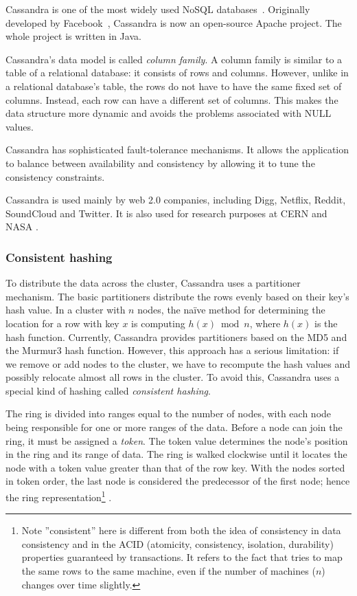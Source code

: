 Cassandra is one of the most widely used NoSQL databases~\cite{Cassandra}. Originally developed by Facebook~\cite{Lakshman:2010:CDS:1773912.1773922}, Cassandra is now an open-source Apache project. The whole project is written in Java.

Cassandra's data model is called \emph{column family}. A column family is similar to a table of a relational database: it consists of rows and columns. However, unlike in a relational database's table, the rows do not have to have the same fixed set of columns. Instead, each row can have a different set of columns. This makes the data structure more dynamic and avoids the problems associated with NULL values.


Cassandra has sophisticated fault-tolerance mechanisms. It allows the application to balance between availability and consistency by allowing it to tune the consistency constraints.

Cassandra is used mainly by web 2.0 companies, including Digg, Netflix, Reddit, SoundCloud and Twitter. It is also used for research purposes at CERN and NASA \cite{CassandraCompanies}.

\subsubsection{Consistent hashing}

To distribute the data across the cluster, Cassandra uses a partitioner mechanism. The basic partitioners distribute the rows evenly based on their key's hash value. In a cluster with $n$ nodes, the na\"ive method for determining the location for a row with key $x$ is computing $ h(x) \bmod n $, where $h(x)$ is the hash function. Currently, Cassandra provides partitioners based on the MD5 and the Murmur3 hash function. However, this approach has a serious limitation: if we remove or add nodes to the cluster, we have to recompute the hash values and possibly relocate almost all rows in the cluster. To avoid this, Cassandra uses a special kind of hashing called \textit{consistent hashing}.

The ring is divided into ranges equal to the number of nodes, with each node being responsible for one or more ranges of the data. Before a node can join the ring, it must be assigned a \textit{token}. The token value determines the node's position in the ring and its range of data. The ring is walked clockwise until it locates the node with a token value greater than that of the row key. %
With the nodes sorted in token order, the last node is considered the predecessor of the first node; hence the ring representation\footnote{Note ''consistent'' here is different from both the idea of consistency in data consistency and in the ACID (atomicity, consistency, isolation, durability) properties guaranteed by transactions. It refers to the fact that tries to map the same rows to the same machine, even if the number of machines ($n$) changes over time slightly.} \cite{CassandraPartitioning}.

